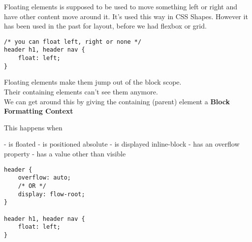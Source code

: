Floating elements is supposed to be used to move something left or right and have other content move around it. It's used this way in CSS Shapes. However it has been used in the past for layout, before we had flexbox or grid.

\begin{verbatim}
/* you can float left, right or none */
header h1, header nav {
	float: left;
}
\end{verbatim}

Floating elements make them jump out of the block scope.
\\
Their containing elements can't see them anymore.
\\
We can get around this by giving the containing (parent) element a \textbf{Block Formatting Context}

This happens when

- is floated
- is positioned absolute
- is displayed inline-block
- has an overflow property
- has a value other than visible


\begin{verbatim}
header {
	overflow: auto;
	/* OR */
	display: flow-root;
}

header h1, header nav {
	float: left;
}
\end{verbatim}
